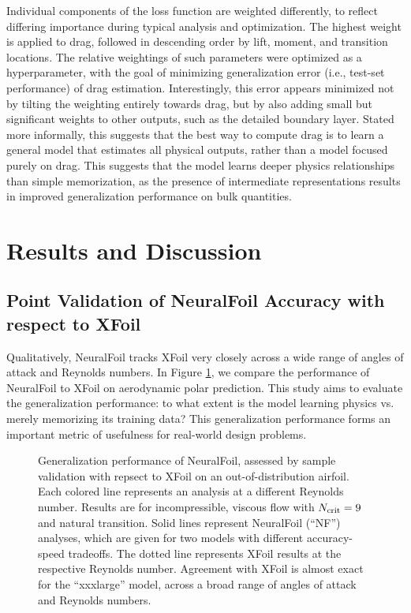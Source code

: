     Individual components of the loss function are weighted differently, to reflect differing importance during typical analysis and optimization. The highest weight is applied to drag, followed in descending order by lift, moment, and transition locations. The relative weightings of such parameters were optimized as a hyperparameter, with the goal of minimizing generalization error (i.e., test-set performance) of drag estimation. Interestingly, this error appears minimized not by tilting the weighting entirely towards drag, but by also adding small but significant weights to other outputs, such as the detailed boundary layer. Stated more informally, this suggests that the best way to compute drag is to learn a general model that estimates all physical outputs, rather than a model focused purely on drag. This suggests that the model learns deeper physics relationships than simple memorization, as the presence of intermediate representations results in improved generalization performance on bulk quantities.


    \section{Results and Discussion}
    \label{sec:nf-results}

    \subsection{Point Validation of NeuralFoil Accuracy with respect to XFoil}
    \label{sec:nf-validation-basic}

    Qualitatively, NeuralFoil tracks XFoil very closely across a wide range of angles of attack and Reynolds numbers. In Figure \ref{fig:nf-clcd-polar}, we compare the performance of NeuralFoil to XFoil on aerodynamic polar prediction. This study aims to evaluate the generalization performance: to what extent is the model learning physics vs. merely memorizing its training data? This generalization performance forms an important metric of usefulness for real-world design problems.

    \begin{figure}[h]
        \centering
        
        \caption{Generalization performance of NeuralFoil, assessed by sample validation with repsect to XFoil on an out-of-distribution airfoil. Each colored line represents an analysis at a different Reynolds number. Results are for incompressible, viscous flow with $N_{\rm crit}=9$ and natural transition. Solid lines represent NeuralFoil (``NF'') analyses, which are given for two models with different accuracy-speed tradeoffs. The dotted line represents XFoil results at the respective Reynolds number. Agreement with XFoil is almost exact for the ``xxxlarge'' model, across a broad range of angles of attack and Reynolds numbers.}
        \label{fig:nf-clcd-polar}
    \end{figure}

